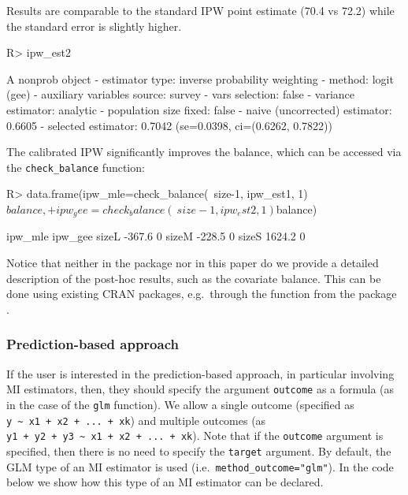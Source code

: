 \documentclass[
]{jss}
\begin{document}
Results are comparable to the standard IPW point estimate (70.4 vs 72.2)
while the standard error is slightly higher.

\begin{CodeChunk}
\begin{CodeInput}
R> ipw_est2
\end{CodeInput}
\begin{CodeOutput}
A nonprob object
 - estimator type: inverse probability weighting
 - method: logit (gee)
 - auxiliary variables source: survey
 - vars selection: false
 - variance estimator: analytic
 - population size fixed: false
 - naive (uncorrected) estimator: 0.6605
 - selected estimator: 0.7042 (se=0.0398, ci=(0.6262, 0.7822))
\end{CodeOutput}
\end{CodeChunk}

The calibrated IPW significantly improves the balance, which can be
accessed via the \texttt{check\_balance} function:

\begin{CodeChunk}
\begin{CodeInput}
R> data.frame(ipw_mle=check_balance(~size-1, ipw_est1, 1)$balance,
+            ipw_gee=check_balance(~size-1, ipw_est2, 1)$balance)
\end{CodeInput}
\begin{CodeOutput}
      ipw_mle ipw_gee
sizeL  -367.6       0
sizeM  -228.5       0
sizeS  1624.2       0
\end{CodeOutput}
\end{CodeChunk}

Notice that neither in the package nor in this paper do we provide a
detailed description of the post-hoc results, such as the covariate
balance. This can be done using existing CRAN packages, e.g.~through the
 function from the  package \citep{cobalt}.

\subsubsection{Prediction-based
approach}\label{prediction-based-approach}

If the user is interested in the prediction-based approach, in
particular involving MI estimators, then, they should specify the
argument \texttt{outcome} as a formula (as in the case of the
\texttt{glm} function). We allow a single outcome (specified as
\texttt{y\ \textasciitilde{}\ x1\ +\ x2\ +\ ...\ +\ xk}) and multiple
outcomes (as
\texttt{y1\ +\ y2\ +\ y3\ \textasciitilde{}\ x1\ +\ x2\ +\ ...\ +\ xk}).
Note that if the \texttt{outcome} argument is specified, then there is
no need to specify the \texttt{target} argument. By default, the GLM
type of an MI estimator is used (i.e.~\texttt{method\_outcome="glm"}).
In the code below we show how this type of an MI estimator can be
declared.
\end{document}

